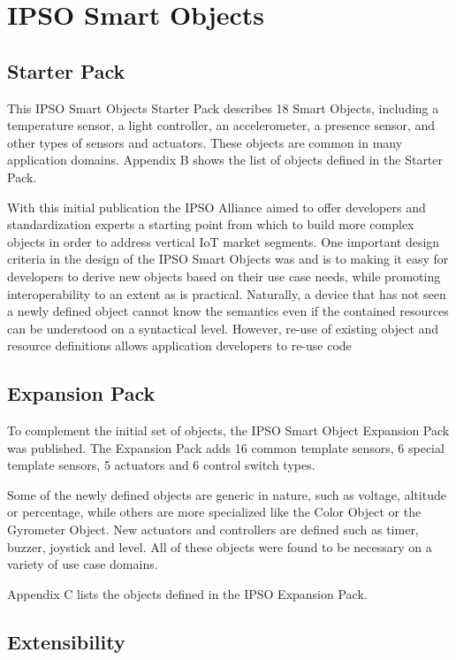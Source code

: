 \documentclass[peerreview, a4paper, 7pt]{IEEEtran}
\begin{document}
\section{IPSO Smart Objects}

\subsection{Starter Pack}

This IPSO Smart Objects Starter Pack describes 18 Smart Objects, including a temperature sensor, a light controller, an accelerometer, a presence sensor, and other types of sensors and actuators. These objects are common in many application domains. Appendix B shows the list of objects defined in the Starter Pack. 

With this initial publication the IPSO Alliance aimed to offer developers and standardization experts a starting point from which to build more complex objects in order to address vertical IoT market segments. One important design criteria in the design of the IPSO Smart Objects was and is to making it easy for developers to derive new objects based on their use case needs, while promoting interoperability to an extent as is practical. Naturally, a device that has not seen a newly defined object cannot know the semantics even if the contained resources can be understood on a syntactical level. However, re-use of existing object and resource definitions allows application developers to re-use code  

\subsection{Expansion Pack}

To complement the initial set of objects, the IPSO Smart Object Expansion Pack was published. The Expansion Pack adds 16 common template sensors, 6 special template sensors, 5 actuators and 6 control switch types.  

Some of the newly defined objects are generic in nature, such as voltage, altitude or percentage, while others are more specialized like the Color Object or the Gyrometer Object. New actuators and controllers are defined such as timer, buzzer, joystick and level. All of these objects were found to be necessary on a variety of use case domains.

Appendix C lists the objects defined in the IPSO Expansion Pack. 

\subsection{Extensibility}
\end{document}
